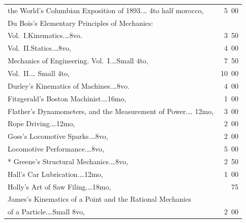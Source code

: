 \documentclass[a4paper,12pt]{book}[2004/02/16]
\providecommand{\colorbox}[2]{#2}
\newcommand{\correction}[2]{\colorbox{corr}{#1}}
\theoremstyle{ilemma}
\theoremstyle{itheorem}
\theoremstyle{iother}
\theoremstyle{icorollary}
\theoremstyle{numcorollary}
\theoremstyle{idefinition}
\begin{document}
\begin{longtable}{@{}l@{ }r@{}}
\nopagebreak

\indent\indent the World's Columbian Exposition of 1893.\dotfill\ldots
4to half morocco, &5\ 00\\

Du Bois's Elementary Principles of Mechanics:\\

\indent Vol.~\phantom{I}I.\quad Kinematics.\dotfill\ldots 8vo. &3\ 50\\

\indent Vol.~II.\quad Statics.\dotfill\ldots 8vo, &4\ 00\\

\indent Mechanics of Engineering. Vol.~I.\dotfill\ldots Small 4to, &7\ 50\\

\indent \phantom{Mechanics of Engineering. }Vol.~II.\dotfill\ldots
Small 4to, &10\ 00\\

Durley's Kinematics of Machines.\dotfill\ldots 8vo. &4\ 00\\



Fitzgerald's Boston Machinist.\dotfill\ldots 16mo, & 1\ 00\\

Flather's Dynamometers, and the Measurement of Power.\dotfill\ldots
12mo, & 3\ 00\\

\indent Rope Driving.\dotfill\ldots 12mo, & 2\ 00\\

Goss's Locomotive Sparks.\dotfill\ldots 8vo, & 2\ 00\\

Locomotive Performance.\dotfill\ldots 8vo, & 5\ 00\\

\correction{}{\indent}* Greene's Structural Mechanics.\dotfill\ldots 8vo, & 2\ 50\\

Hall's Car Lubrication.\dotfill\ldots 12mo, & 1\ 00 \\

Holly's Art of Saw Filing.\dotfill\ldots 18mo, & \ 75\\

James's Kinematics of a Point and the Rational Mechanics\\

\nopagebreak

\indent\indent of a Particle.\dotfill\ldots Small 8vo, & 2\ 00\\


\end{longtable}
\end{document}
